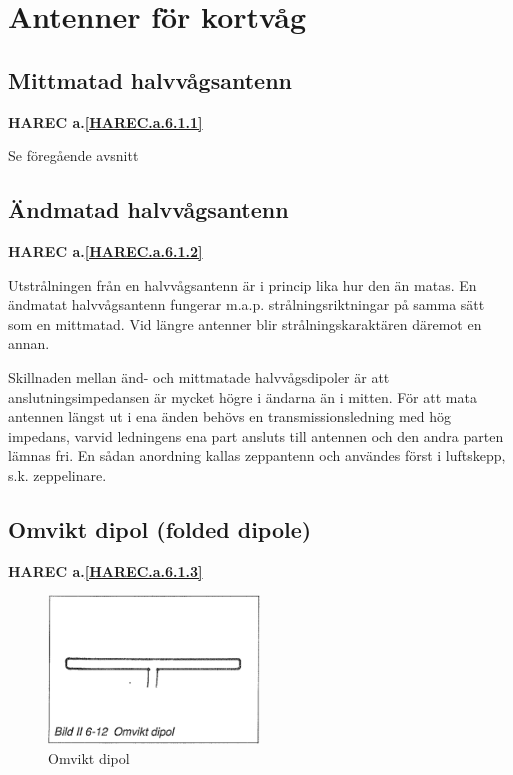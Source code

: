 \section{Antenner för kortvåg}

\subsection{Mittmatad halvvågsantenn}
\textbf{
HAREC a.\ref{HAREC.a.6.1.1}\label{myHAREC.a.6.1.1}
}

Se föregående avsnitt

\subsection{Ändmatad halvvågsantenn}
\textbf{
HAREC a.\ref{HAREC.a.6.1.2}\label{myHAREC.a.6.1.2}
}

Utstrålningen från en halvvågsantenn är i princip lika hur den än
matas. En ändmatat halvvågsantenn fungerar m.a.p. strålningsriktningar
på samma sätt som en mittmatad. Vid längre antenner blir
strålningskaraktären däremot en annan.

Skillnaden mellan änd- och mittmatade halvvågsdipoler är att
anslutningsimpedansen är mycket högre i ändarna än i mitten. För att
mata antennen längst ut i ena änden behövs en transmissionsledning med
hög impedans, varvid ledningens ena part ansluts till antennen och den
andra parten lämnas fri. En sådan anordning kallas zeppantenn och
användes först i luftskepp, s.k. zeppelinare.

\subsection{Omvikt dipol (folded dipole)}
\textbf{
HAREC a.\ref{HAREC.a.6.1.3}\label{myHAREC.a.6.1.3}
}

\begin{figure}
  \includegraphics[width=0.5\textwidth]{images/bild_2_6-12}
  \caption{Omvikt dipol}
  \label{fig:bildII6-12}
\end{figure}

